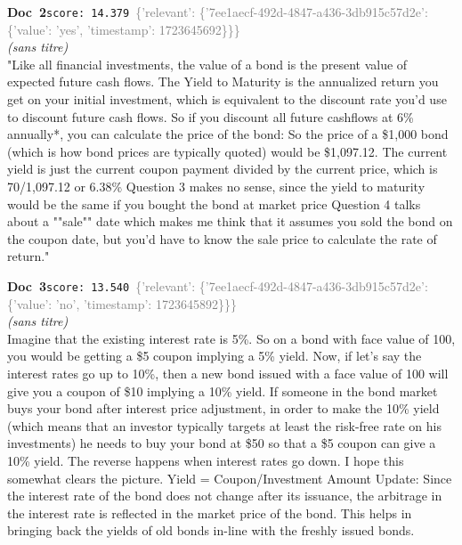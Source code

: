 \documentclass[a4paper,11pt]{article}
\begin{document}
\begin{docenv}
{\footnotesize\textcolor{doccolor}{\textbf{Doc~2}}}\hfill{\tiny\texttt{score:~14.379}}\ {\tiny\textcolor{gray}{\{'relevant': \{'7ee1aecf-492d-4847-a436-3db915c57d2e': \{'value': 'yes', 'timestamp': 1723645692\}\}\}}}\\[3pt]
{\small\textit{(sans titre)}}\\[2pt]
\vspace{2pt}
{\footnotesize 
"Like all financial investments, the value of a bond is the present value of expected future cash flows.  The Yield to Maturity is the annualized return you get on your initial investment, which is equivalent to the discount rate you'd use to discount future cash flows. So if you discount all future cashflows at 6\% annually*, you can calculate the price of the bond: So the price of a \$1,000 bond (which is how bond prices are typically quoted) would be \$1,097.12. The current yield is just the current coupon payment divided by the current price, which is 70/1,097.12 or 6.38\% Question 3 makes no sense, since the yield to maturity would be the same if you bought the bond at market price Question 4 talks about a ""sale"" date which makes me think that it assumes you sold the bond on the coupon date, but you'd have to know the sale price to calculate the rate of return."}
\end{docenv}
\begin{docenv}
{\footnotesize\textcolor{doccolor}{\textbf{Doc~3}}}\hfill{\tiny\texttt{score:~13.540}}\ {\tiny\textcolor{gray}{\{'relevant': \{'7ee1aecf-492d-4847-a436-3db915c57d2e': \{'value': 'no', 'timestamp': 1723645892\}\}\}}}\\[3pt]
{\small\textit{(sans titre)}}\\[2pt]
\vspace{2pt}
{\footnotesize 
Imagine that the existing interest rate is 5\%. So on a bond with face value of 100, you would be getting a \$5 coupon implying a 5\% yield. Now, if let's say the interest rates go up to 10\%, then a new bond issued with a face value of 100 will give you a coupon of \$10 implying a 10\% yield. If someone in the bond market buys your bond after interest price adjustment, in order to make the 10\% yield (which means that an investor typically targets at least the risk-free rate on his investments) he needs to buy your bond at \$50 so that a \$5 coupon can give a 10\% yield. The reverse happens when interest rates go down. I hope this somewhat clears the picture. Yield = Coupon/Investment Amount Update: Since the interest rate of the bond does not change after its issuance, the arbitrage in the interest rate is reflected in the market price of the bond. This helps in bringing back the yields of old bonds in-line with the freshly issued bonds.}
\end{docenv}
\end{document}
